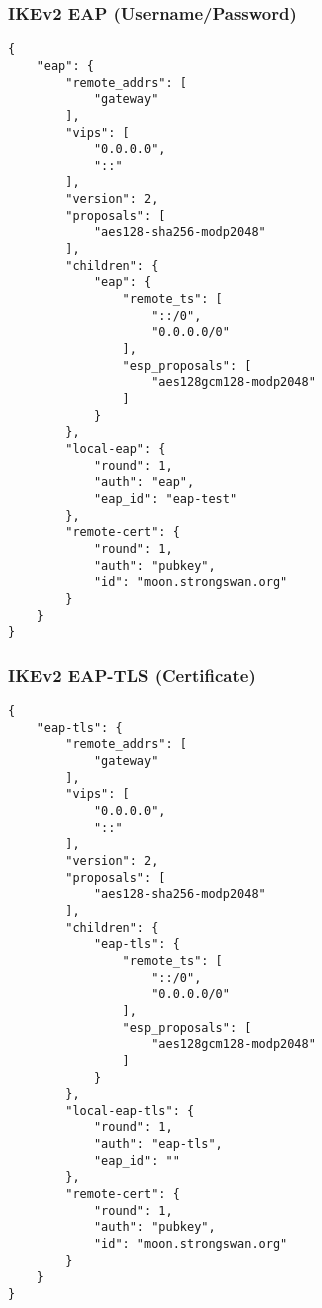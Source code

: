 \subsubsection{IKEv2 EAP (Username/Password)}
\begin{lstlisting}[style=BashInputStyle]
{
    "eap": {
        "remote_addrs": [
            "gateway"
        ],
        "vips": [
            "0.0.0.0",
            "::"
        ],
        "version": 2,
        "proposals": [
            "aes128-sha256-modp2048"
        ],
        "children": {
            "eap": {
                "remote_ts": [
                    "::/0",
                    "0.0.0.0/0"
                ],
                "esp_proposals": [
                    "aes128gcm128-modp2048"
                ]
            }
        },
        "local-eap": {
            "round": 1,
            "auth": "eap",
            "eap_id": "eap-test"
        },
        "remote-cert": {
            "round": 1,
            "auth": "pubkey",
            "id": "moon.strongswan.org"
        }
    }
}
\end{lstlisting}
\newpage
\subsubsection{IKEv2 EAP-TLS (Certificate)}
\begin{lstlisting}[style=BashInputStyle]
{
    "eap-tls": {
        "remote_addrs": [
            "gateway"
        ],
        "vips": [
            "0.0.0.0",
            "::"
        ],
        "version": 2,
        "proposals": [
            "aes128-sha256-modp2048"
        ],
        "children": {
            "eap-tls": {
                "remote_ts": [
                    "::/0",
                    "0.0.0.0/0"
                ],
                "esp_proposals": [
                    "aes128gcm128-modp2048"
                ]
            }
        },
        "local-eap-tls": {
            "round": 1,
            "auth": "eap-tls",
            "eap_id": ""
        },
        "remote-cert": {
            "round": 1,
            "auth": "pubkey",
            "id": "moon.strongswan.org"
        }
    }
}
\end{lstlisting}

\newpage
